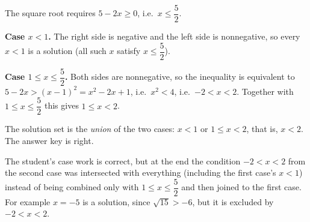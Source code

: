 The square root requires $5-2x\ge0$, i.e.\ $x\le\dfrac{5}{2}$.

\textbf{Case $x<1$.} The right side is negative and the left side is nonnegative, so every $x<1$ is a solution (all such $x$ satisfy $x\le\dfrac{5}{2}$).

\textbf{Case $1\le x\le\dfrac{5}{2}$.} Both sides are nonnegative, so the inequality is equivalent to $5-2x>(x-1)^2=x^2-2x+1$, i.e.\ $x^2<4$, i.e.\ $-2<x<2$. Together with $1\le x\le\dfrac{5}{2}$ this gives $1\le x<2$.

The solution set is the \emph{union} of the two cases: $x<1$ or $1\le x<2$, that is, $\boxed{x<2}$. The answer key is right.

The student's case work is correct, but at the end the condition $-2<x<2$ from the second case was intersected with everything (including the first case's $x<1$) instead of being combined only with $1\le x\le\dfrac{5}{2}$ and then joined to the first case. For example $x=-5$ is a solution, since $\sqrt{15}>-6$, but it is excluded by $-2<x<2$.

